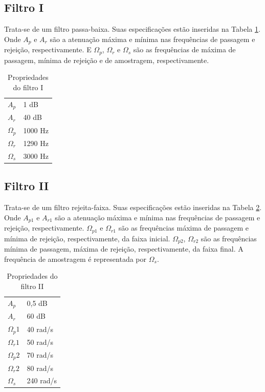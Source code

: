 \documentclass[a4paper,10pt]{article}
\begin{document}
\subsection{Filtro I}
Trata-se de um filtro passa-baixa. Suas especificações estão inseridas na Tabela \ref{tab:tabfiltro1}. Onde \(A_p\) e \(A_r\) são a atenuação máxima e mínima nas frequências de passagem e rejeição, respectivamente. E \(\Omega_p\), \(\Omega_r\) e \(\Omega_s\) são as frequências de máxima de passagem, mínima de rejeição e de amostragem, respectivamente.

\begin{table}
\centering
\begin{tabular}{|l|l|}

\(A_p\) 	& 1 dB		\\
\(A_r\) 	& 40 dB		\\
\(\Omega_p\) 	& 1000 Hz	\\
\(\Omega_r\) 	& 1290 Hz	\\
\(\Omega_s\) 	& 3000 Hz	\\

\end{tabular}
\caption{Propriedades do filtro I}
\label{tab:tabfiltro1}
\end{table}

\subsection{Filtro II}
Trata-se de um filtro rejeita-faixa. Suas especificações estão inseridas na Tabela \ref{tab:tabfiltro2}. Onde \(A_{p1}\) e \(A_{r1}\) são a atenuação máxima e mínima nas frequências de passagem e rejeição, respectivamente. \(\Omega_{p1}\) e \(\Omega_{r1}\) são as frequências  máxima de passagem e mínima de rejeição, respectivamente, da faixa inicial. \(\Omega_{p2}\), \(\Omega_{r2}\) são as frequências mínima de passagem, máxima de rejeição, respectivamente, da faixa final.
A frequ\^encia de amostragem \'e representada por \(\Omega_s\).

\begin{table}[ht]
\centering
\begin{tabular}{|l|l|}

\(A_p\) 	& 0,5 dB	\\
\(A_r\) 	& 60 dB		\\
\(\Omega_p1\) 	& 40 rad/s	\\
\(\Omega_r1\) 	& 50 rad/s	\\
\(\Omega_p2\) 	& 70 rad/s	\\
\(\Omega_r2\) 	& 80 rad/s	\\
\(\Omega_s\) 	& 240 rad/s	\\

\end{tabular}
\caption{Propriedades do filtro II}
\label{tab:tabfiltro2}
\end{table}
\end{document}
